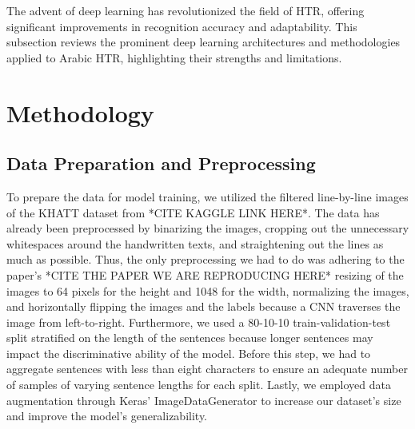 \documentclass[conference]{IEEEtran}
\newcounter{customsubsubsection} %
\let\oldsubsection\subsection
\renewcommand{\subsection}[1]{%
  \oldsubsection{#1}%
  \setcounter{customsubsubsection}{0}%
}
\begin{document}
The advent of deep learning has revolutionized the field of HTR, offering significant improvements in recognition accuracy and adaptability. This subsection reviews the prominent deep learning architectures and methodologies applied to Arabic HTR, highlighting their strengths and limitations.








\section{Methodology}



\subsection{Data Preparation and Preprocessing}


To prepare the data for model training, we utilized the filtered line-by-line images of the KHATT dataset from *CITE KAGGLE LINK HERE*. The data has already been preprocessed by binarizing the images, cropping out the unnecessary whitespaces around the handwritten texts, and straightening out the lines as much as possible. Thus, the only preprocessing we had to do was adhering to the paper's *CITE THE PAPER WE ARE REPRODUCING HERE* resizing of the images to 64 pixels for the height and 1048 for the width, normalizing the images, and horizontally flipping the images and the labels because a CNN traverses the image from left-to-right. Furthermore, we used a 80-10-10 train-validation-test split stratified on the length of the sentences because longer sentences may impact the discriminative ability of the model. Before this step, we had to aggregate sentences with less than eight characters to ensure an adequate number of samples of varying sentence lengths for each split. Lastly, we employed data augmentation through Keras' ImageDataGenerator to increase our dataset's size and improve the model's generalizability.
\end{document}
